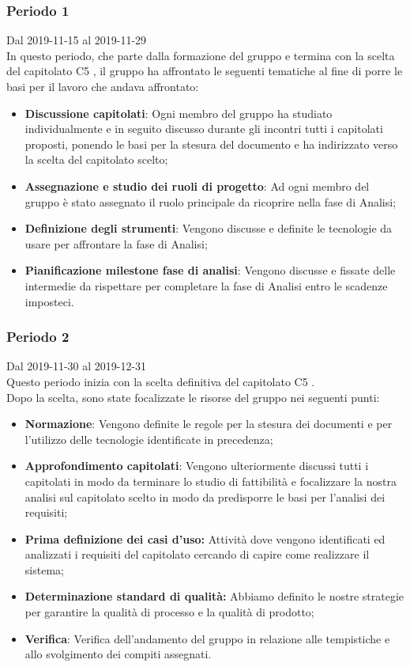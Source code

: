 \subsubsection{Periodo 1} 
Dal 2019-11-15 al 2019-11-29\\
In questo periodo, che parte dalla formazione del gruppo e termina con la scelta del capitolato C5 \NomeProgetto{}, il gruppo ha affrontato le seguenti tematiche al fine di porre le basi per il lavoro che andava affrontato:
\begin{itemize}
	\item \textbf{Discussione capitolati}: Ogni membro del gruppo ha studiato individualmente e in seguito discusso durante gli incontri tutti i capitolati proposti, ponendo le basi per la stesura del documento \SdF{} e ha indirizzato verso la scelta del capitolato scelto;
	\item \textbf{Assegnazione e studio dei ruoli di progetto}: Ad ogni membro del gruppo è stato assegnato il ruolo principale da ricoprire nella fase di Analisi;
	\item \textbf{Definizione degli strumenti}: Vengono discusse e definite le tecnologie da usare per affrontare la fase di Analisi;
	\item \textbf{Pianificazione milestone fase di analisi}: Vengono discusse e fissate delle  intermedie da rispettare per completare la fase di Analisi entro le scadenze imposteci.
\end{itemize}
\subsubsection{Periodo 2} 
Dal 2019-11-30 al 2019-12-31\\
Questo periodo inizia con la scelta definitiva del capitolato C5 \NomeProgetto{}.\\
Dopo la scelta, sono state focalizzate le risorse del gruppo nei seguenti punti:
\begin{itemize}
	\item \textbf{Normazione}: Vengono definite le regole per la stesura dei documenti e per l'utilizzo delle tecnologie identificate in precedenza;
	\item \textbf{Approfondimento capitolati}: Vengono ulteriormente discussi tutti i capitolati in modo da terminare lo studio di fattibilità e focalizzare la nostra analisi sul capitolato scelto in modo da predisporre le basi per l'analisi dei requisiti;
	\item \textbf{Prima definizione dei casi d'uso:} Attività dove vengono identificati ed analizzati i requisiti del capitolato cercando di capire come realizzare il sistema;
	\item \textbf{Determinazione standard di qualità:} Abbiamo definito le nostre strategie per garantire la qualità di processo e la qualità di prodotto;
	\item \textbf{Verifica}: Verifica dell'andamento del gruppo in relazione alle tempistiche e allo svolgimento dei compiti assegnati.
\end{itemize}
